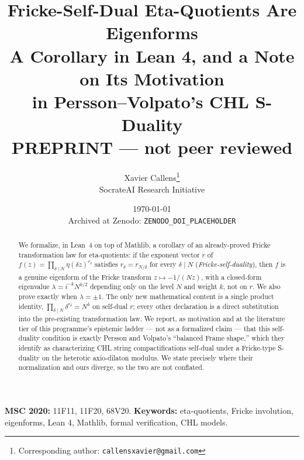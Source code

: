 \documentclass[11pt, a4paper]{article}
\title{\textbf{Fricke-Self-Dual Eta-Quotients Are Eigenforms}\\[0.3em]
  \large\textbf{A Corollary in Lean 4, and a Note on Its Motivation \\ in Persson--Volpato's CHL S-Duality}\\[0.8em]
  \large\textcolor{BrickRed}{PREPRINT --- not peer reviewed}}
\author{
  Xavier Callens\thanks{Corresponding author: \texttt{callensxavier@gmail.com}} \\
  \small SocrateAI Research Initiative
}
\date{\today\\[0.6em]
  \small Archived at Zenodo: \texttt{ZENODO\_DOI\_PLACEHOLDER}}
\theoremstyle{remark}
\begin{document}
\maketitle

\begin{center}
\end{center}

\begin{abstract}
We formalize, in Lean~4 on top of Mathlib, a corollary of an already-proved Fricke transformation
law for eta-quotients: if the exponent vector $r$ of $f(z) = \prod_{\delta\mid N}\eta(\delta z)^{r_\delta}$
satisfies $r_\delta = r_{N/\delta}$ for every $\delta\mid N$ (\emph{Fricke-self-duality}), then $f$
is a genuine eigenform of the Fricke transform $z\mapsto -1/(Nz)$, with a closed-form eigenvalue
$\lambda = i^{-k}N^{k/2}$ depending only on the level $N$ and weight $k$, not on $r$. We also prove
exactly when $\lambda=\pm1$. The only new mathematical content is a single product identity,
$\prod_{\delta\mid N}\delta^{r_\delta}=N^k$ on self-dual $r$; every other declaration is a direct
substitution into the pre-existing transformation law. We report, as motivation and at the
literature tier of this programme's epistemic ladder --- not as a formalized claim --- that this
self-duality condition is exactly Persson and Volpato's ``balanced Frame shape,'' which they
identify as characterizing CHL string compactifications self-dual under a Fricke-type S-duality on
the heterotic axio-dilaton modulus. We state precisely where their normalization and ours
diverge, so the two are not conflated.
\end{abstract}

\noindent\textbf{MSC 2020:} 11F11, 11F20, 68V20.\quad
\textbf{Keywords:} eta-quotients, Fricke involution, eigenforms, Lean 4, Mathlib, formal
verification, CHL models.
\end{document}
